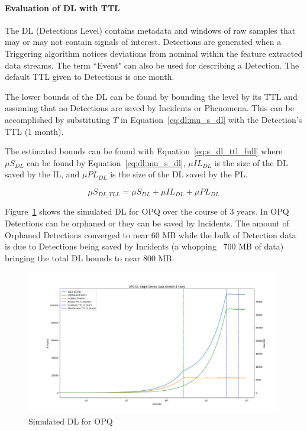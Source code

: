 \paragraph{Evaluation of DL with TTL}

The DL (Detections Level) contains metadata and windows of raw samples that may or may not contain signals of interest. Detections are generated when a Triggering algorithm notices deviations from nominal within the feature extracted data streams. The term ``Event" can also be used for describing a Detection. The default TTL given to Detections is one month.

The lower bounds of the DL can be found by bounding the level by its TTL and assuming that no Detections are saved by Incidents or Phenomena. This can be accomplished by substituting $T$ in Equation~\ref{eq:dl:mu_s_dl} with the Detection's TTL (1 month).

The estimated bounds can be found with Equation~\ref{eq:s_dl_ttl_full} where $\mu S_{DL}$ can be found by Equation~\ref{eq:dl:mu_s_dl}, $\mu IL_{DL}$ is the size of the DL saved by the IL, and $\mu PL_{DL}$ is the size of the DL saved by the PL\@.

\begin{equation}\label{eq:s_dl_ttl_full}
	\mu S_{DL\_TLL} = \mu S_{DL} + \mu IL_{DL} + \mu PL_{DL}
\end{equation}

Figure~\ref{fig:sim_dl_opq} shows the simulated DL for OPQ over the course of 3 years. In OPQ Detections can be orphaned or they can be saved by Incidents. The amount of Orphaned Detections converged to near 60 MB while the bulk of Detection data is due to Detections being saved by Incidents (a whopping ~700 MB of data) bringing the total DL bounds to near 800 MB\@.

\begin{figure}[H]
	\centering
	\includegraphics[width=\linewidth]{figures/sim_dl_opq.png}
	\caption{Simulated DL for OPQ}
	\label{fig:sim_dl_opq}
\end{figure}

